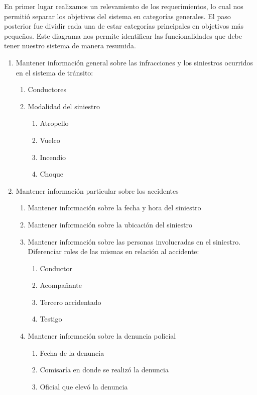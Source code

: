 En primer lugar realizamos un relevamiento de los requerimientos, lo cual nos permitió separar los objetivos del sistema en categorías generales. El paso posterior
fue dividir cada una de estar categorías principales en objetivos más peque\~nos. Este diagrama nos permite identificar las funcionalidades que debe tener nuestro 
sistema de manera resumida.

\begin{enumerate}
	\item{Mantener información general sobre las infracciones y los siniestros ocurridos en el sistema de tránsito:}
		\begin{enumerate}
			\item Conductores
			\item Modalidad del siniestro
				\begin{enumerate}
					\item Atropello
					\item Vuelco
					\item Incendio
					\item Choque
				\end{enumerate}
		\end{enumerate}
	\item{Mantener información particular sobre los accidentes}
		\begin{enumerate}
			\item Mantener información sobre la fecha y hora del siniestro
			\item Mantener información sobre la ubicación del siniestro
			\item{Mantener información sobre las personas involucradas en el siniestro. Diferenciar roles de las mismas en relación al accidente:}
				\begin{enumerate}
					\item Conductor
					\item Acompa\~nante
					\item Tercero accidentado
					\item Testigo
				\end{enumerate}
			\item Mantener información sobre la denuncia policial
				\begin{enumerate}
					\item Fecha de la denuncia
					\item Comisaría en donde se realizó la denuncia
					\item Oficial que elevó la denuncia
				\end{enumerate}

\end{enumerate}
\end{enumerate}
